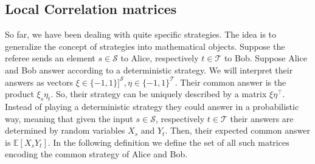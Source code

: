 \subsection{Local Correlation matrices}
So far, we have been dealing with quite specific strategies. The idea is to generalize the concept of strategies into mathematical objects. Suppose the referee sends an element $ s \in \mathcal{S} $ to Alice, respectively $ t \in\mathcal{T} $ to Bob. Suppose Alice and Bob answer according to a deterministic strategy. We will interpret their answers as vectors $ \xi \in \{-1,1\}]^{\mathcal{S}}, \eta \in \{-1,1\}^{\mathcal{T}} $.  Their common answer is the product $ \xi_s\eta_t $. So, their strategy can be uniquely described by a  matrix $ \xi\eta^\top $.  Instead of playing a deterministic strategy they could answer in a probabilistic way, meaning that given the input $ s \in \mathcal{S} $, respectively $ t \in \mathcal{T} $ their answers are determined by random variables $ X_s $ and $ Y_t $. Then, their expected common answer is $ \mathbb{E}[X_sY_t] $. In the following definition we define the set of all such matrices encoding the common strategy of Alice and Bob.

